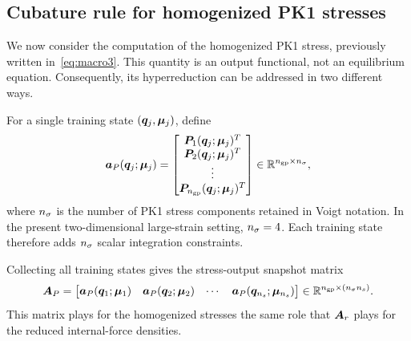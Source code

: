 \documentclass[11pt,a4paper]{article}
\newcommand{\PROMPT}[1]{ }
\begin{document}
\PROMPT{}
%
\subsection{Cubature rule for homogenized PK1 stresses}
\label{subsec:cubature_PK1_stresses}

We now consider the computation of the homogenized PK1 stress, previously
written in~\eqref{eq:macro3}. This quantity is an output functional, not an
equilibrium equation. Consequently, its hyperreduction can be addressed in two
different ways.

For a single training state $(\bm{q}_j,\bm{\mu}_j)$, define
\begin{equation}
    \bm{a}_{P}(\bm{q}_j;\bm{\mu}_j)
    =
    \begin{bmatrix}
        \boldsymbol{P}_1(\bm{q}_j;\bm{\mu}_j)^T\\
        \boldsymbol{P}_2(\bm{q}_j;\bm{\mu}_j)^T\\
        \vdots\\
        \boldsymbol{P}_{n_{\mathrm{gp}}}(\bm{q}_j;\bm{\mu}_j)^T
    \end{bmatrix}
    \in \mathbb{R}^{n_{\mathrm{gp}}\times n_{\sigma}},
    \label{eq:aP_single_state}
\end{equation}
where $n_{\sigma}$ is the number of PK1 stress components retained in Voigt
notation. In the present two-dimensional large-strain setting, $n_{\sigma}=4$.
Each training state therefore adds $n_{\sigma}$ scalar integration constraints.

Collecting all training states gives the stress-output snapshot matrix
\begin{equation}
    \bm{A}_{P}
    =
    \begin{bmatrix}
        \bm{a}_{P}(\bm{q}_1;\bm{\mu}_1) &
        \bm{a}_{P}(\bm{q}_2;\bm{\mu}_2) &
        \cdots &
        \bm{a}_{P}(\bm{q}_{n_s};\bm{\mu}_{n_s})
    \end{bmatrix}
    \in \mathbb{R}^{n_{\mathrm{gp}}\times(n_{\sigma}n_s)} .
    \label{eq:AP_training_matrix}
\end{equation}
This matrix plays for the homogenized stresses the same role that $\bm{A}_{r}$
plays for the reduced internal-force densities.
\end{document}
